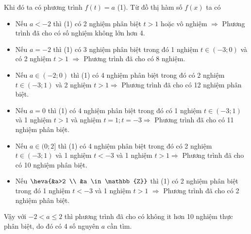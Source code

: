 \begin{ex}
{\begin{center}
		\end{center}
		Khi đó ta có phương trình ${f(t)=a}$ (1). Từ đồ thị hàm số ${f(x)}$ ta có
		\begin{itemize}
			\item Nếu $a<-2$ thì (1) có 2 nghiệm phân biệt $t>1$ hoặc vô nghiệm $\Rightarrow$ Phương trình đã cho có số nghiệm không lớn hơn 4.
			\item Nếu $a=-2$ thì (1) có 3 nghiệm phân biệt trong đó 1 nghiệm $t \in(-3 ; 0)$ và có 2 nghiệm
			$t>1$ $\Rightarrow$ Phương trình đã cho có 8 nghiệm.
			\item Nếu $a \in(-2 ; 0)$ thì (1) có 4 nghiệm phân biệt 
			trong đó có 2 nghiệm $t \in(-3 ; 1)$ và 2 nghiệm $t>1 \Rightarrow$ Phương trình đã cho có 12 nghiệm phân biệt.
			\item Nếu $a=0$ thì (1) có 4 nghiệm phân biệt trong đó có 1 nghiệm $t \in(-3 ; 1)$ và 1 nghiệm $t>1$ 	và nghiệm $t=1 ; t=-3 \Rightarrow$ Phương trình đã cho có 11 nghiệm phân biệt.
			\item Nếu $a \in(0 ; 2]$ thì (1) có 4 nghiệm phân biệt trong đó có 2 nghiệm $t \in(-3 ; 1)$ và 1 nghiệm
			${t<-3}$ và 1 nghiệm $t>1 \Rightarrow$ Phương trình đã cho có 10 nghiệm phân biệt.
			\item Nếu $\heva{&a>2 \\ &a \in \mathbb{Z}}$ thì (1) có 2 nghiệm phân biệt trong đó 1 nghiệm $t<-3$ và 1 nghiệm $t>1$ $\Rightarrow$ Phương trình đã cho có 2 nghiệm phân biệt.
		\end{itemize}
		Vậy với $-2<a \leq 2$ thì phương trình đã cho có không it hơn 10 nghiệm thực phân biệt, do đó có 4 số nguyên $a$ cần tìm.
	}
\end{ex}
